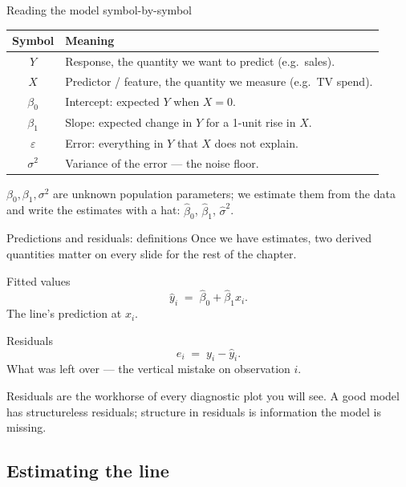 \documentclass[aspectratio=169,11pt]{beamer}
\begin{document}
\begin{frame}{Reading the model symbol-by-symbol}
  \begin{readme}
    \begin{tabular}{@{}cl@{}}
      \toprule
      \textbf{Symbol} & \textbf{Meaning} \\
      \midrule
      $Y$        & Response, the quantity we want to predict (e.g.\ sales). \\
      $X$        & Predictor / feature, the quantity we measure (e.g.\ TV spend). \\
      $\beta_0$  & Intercept: expected $Y$ when $X = 0$. \\
      $\beta_1$  & Slope: expected change in $Y$ for a 1-unit rise in $X$. \\
      $\varepsilon$ & Error: everything in $Y$ that $X$ does not explain. \\
      $\sigma^2$ & Variance of the error --- the noise floor. \\
      \bottomrule
    \end{tabular}
  \end{readme}
  $\beta_0, \beta_1, \sigma^2$ are unknown population parameters; we
  estimate them from the data and write the estimates with a hat:
  $\hat\beta_0$, $\hat\beta_1$, $\hat\sigma^2$.
\end{frame}

\begin{frame}{Predictions and residuals: definitions}
  Once we have estimates, two derived quantities matter on every slide
  for the rest of the chapter.
  \begin{block}{Fitted values}
    \[
      \hat y_i \;=\; \hat\beta_0 + \hat\beta_1 x_i.
    \]
    The line's prediction at $x_i$.
  \end{block}
  \begin{block}{Residuals}
    \[
      e_i \;=\; y_i - \hat y_i.
    \]
    What was left over --- the vertical mistake on observation $i$.
  \end{block}
  \begin{takeaway}
    Residuals are the workhorse of every diagnostic plot you will see.
    A good model has structureless residuals; structure in residuals
    is information the model is missing.
  \end{takeaway}
\end{frame}


\subsection{Estimating the line}
\end{document}

